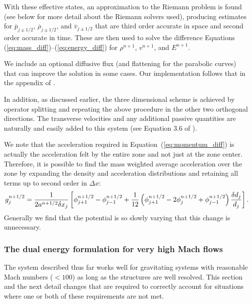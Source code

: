 With these effective states, an approximation to the Riemann problem is found
(see below for more detail about the Riemann solvers used), producing estimates for 
$\overline{p}_{j\pm 1/2}$, $\overline{\rho}_{j\pm1/2}$, and $\overline{v}_{j\pm 1/2}$ that are third order
accurate in space and second order accurate in time.  These are then
used to solve the difference Equations (\ref{eq:mass_diff})--(\ref{eq:energy_diff}) for $\rho^{n+1}$, $v^{n+1}$, and $E^{n+1}$.

We include an optional diffusive flux (and flattening for the parabolic curves) that can improve the solution in some cases.  Our implementation follows that in the appendix of \citet{1984JCoPh..54..174C}.

In addition, as discussed earlier, the three dimensional scheme is achieved by operator splitting and repeating the above procedure in the other two orthogonal directions.  The transverse velocities and any additional passive quantities are naturally and easily added to this system (see Equation 3.6 of \citet{1984JCoPh..54..174C}).  

We note that the acceleration required in Equation~(\ref{eq:momentum_diff}) is actually the
acceleration felt by the entire zone and not just at the zone center.
Therefore, it is possible to find the mass weighted average acceleration over the zone
by expanding the density and acceleration distributions and
retaining all terms up to second order in $\Delta x$:
%
\begin{equation}
g_j^{n+1/2} = 
       \frac{1}{2 a^{n+1/2} \delta x_j} \left[ 
             \phi_{j+1}^{n+1/2} 
           - \phi_{j-1}^{n+1/2} 
           + \frac{1}{12} \left(    \phi^{n+1/2}_{j+1} 
                                 - 2\phi^{n+1/2}_j 
                                 + \phi^{n+1/2}_{j-1} \right) 
                                   {\delta d_j \over d_j}
       \right].
       \label{eq:accel}
\end{equation}
Generally we find that the potential is so slowly varying that this change is unnecessary.


\subsubsection{The dual energy formulation for  very high Mach flows} %

The system described thus far works well for gravitating systems with
reasonable Mach numbers ($<100$) as long as the structures are well resolved.
This section and the next detail changes that are required
to correctly account for situations where one or both of these
requirements are not met.

